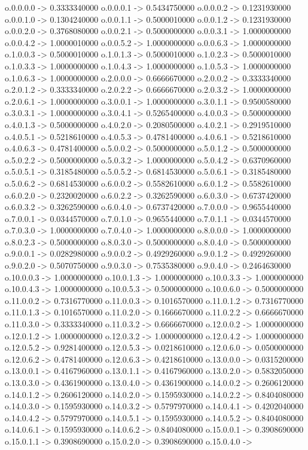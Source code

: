 o.0.0.0.0 -> 0.3333340000    o.0.0.0.1 -> 0.5434750000    o.0.0.0.2 -> 0.1231930000    o.0.0.1.0 -> 0.1304240000    o.0.0.1.1 -> 0.5000010000    o.0.0.1.2 -> 0.1231930000    o.0.0.2.0 -> 0.3768080000    o.0.0.2.1 -> 0.5000000000    o.0.0.3.1 -> 1.0000000000    o.0.0.4.2 -> 1.0000010000    o.0.0.5.2 -> 1.0000000000    o.0.0.6.3 -> 1.0000000000    o.1.0.0.3 -> 0.5000010000    o.1.0.1.3 -> 0.5000010000    o.1.0.2.3 -> 0.5000010000    o.1.0.3.3 -> 1.0000000000    o.1.0.4.3 -> 1.0000000000    o.1.0.5.3 -> 1.0000000000    o.1.0.6.3 -> 1.0000000000    o.2.0.0.0 -> 0.6666670000    o.2.0.0.2 -> 0.3333340000    o.2.0.1.2 -> 0.3333340000    o.2.0.2.2 -> 0.6666670000    o.2.0.3.2 -> 1.0000000000    o.2.0.6.1 -> 1.0000000000    o.3.0.0.1 -> 1.0000000000    o.3.0.1.1 -> 0.9500580000    o.3.0.3.1 -> 1.0000000000    o.3.0.4.1 -> 0.5265400000    o.4.0.0.3 -> 0.5000000000    o.4.0.1.3 -> 0.5000000000    o.4.0.2.0 -> 0.2080500000    o.4.0.2.1 -> 0.2919510000    o.4.0.5.1 -> 0.5218610000    o.4.0.5.3 -> 0.4781400000    o.4.0.6.1 -> 0.5218610000    o.4.0.6.3 -> 0.4781400000    o.5.0.0.2 -> 0.5000000000    o.5.0.1.2 -> 0.5000000000    o.5.0.2.2 -> 0.5000000000    o.5.0.3.2 -> 1.0000000000    o.5.0.4.2 -> 0.6370960000    o.5.0.5.1 -> 0.3185480000    o.5.0.5.2 -> 0.6814530000    o.5.0.6.1 -> 0.3185480000    o.5.0.6.2 -> 0.6814530000    o.6.0.0.2 -> 0.5582610000    o.6.0.1.2 -> 0.5582610000    o.6.0.2.0 -> 0.2320020000    o.6.0.2.2 -> 0.3262590000    o.6.0.3.0 -> 0.6737420000    o.6.0.3.2 -> 0.3262590000    o.6.0.4.0 -> 0.6737420000    o.7.0.0.0 -> 0.9655440000    o.7.0.0.1 -> 0.0344570000    o.7.0.1.0 -> 0.9655440000    o.7.0.1.1 -> 0.0344570000    o.7.0.3.0 -> 1.0000000000    o.7.0.4.0 -> 1.0000000000    o.8.0.0.0 -> 1.0000000000    o.8.0.2.3 -> 0.5000000000    o.8.0.3.0 -> 0.5000000000    o.8.0.4.0 -> 0.5000000000    o.9.0.0.1 -> 0.0282980000    o.9.0.0.2 -> 0.4929260000    o.9.0.1.2 -> 0.4929260000    o.9.0.2.0 -> 0.5070750000    o.9.0.3.0 -> 0.7535380000    o.9.0.4.0 -> 0.2464630000    o.10.0.0.3 -> 1.0000000000    o.10.0.1.3 -> 1.0000000000    o.10.0.3.3 -> 1.0000000000    o.10.0.4.3 -> 1.0000000000    o.10.0.5.3 -> 0.5000000000    o.10.0.6.0 -> 0.5000000000    o.11.0.0.2 -> 0.7316770000    o.11.0.0.3 -> 0.1016570000    o.11.0.1.2 -> 0.7316770000    o.11.0.1.3 -> 0.1016570000    o.11.0.2.0 -> 0.1666670000    o.11.0.2.2 -> 0.6666670000    o.11.0.3.0 -> 0.3333340000    o.11.0.3.2 -> 0.6666670000    o.12.0.0.2 -> 1.0000000000    o.12.0.1.2 -> 1.0000000000    o.12.0.3.2 -> 1.0000000000    o.12.0.4.2 -> 1.0000000000    o.12.0.5.2 -> 0.9281400000    o.12.0.5.3 -> 0.0218610000    o.12.0.6.0 -> 0.0500000000    o.12.0.6.2 -> 0.4781400000    o.12.0.6.3 -> 0.4218610000    o.13.0.0.0 -> 0.0315200000    o.13.0.0.1 -> 0.4167960000    o.13.0.1.1 -> 0.4167960000    o.13.0.2.0 -> 0.5832050000    o.13.0.3.0 -> 0.4361900000    o.13.0.4.0 -> 0.4361900000    o.14.0.0.2 -> 0.2606120000    o.14.0.1.2 -> 0.2606120000    o.14.0.2.0 -> 0.1595930000    o.14.0.2.2 -> 0.8404080000    o.14.0.3.0 -> 0.1595930000    o.14.0.3.2 -> 0.5797970000    o.14.0.4.1 -> 0.4202040000    o.14.0.4.2 -> 0.5797970000    o.14.0.5.1 -> 0.1595930000    o.14.0.5.2 -> 0.8404080000    o.14.0.6.1 -> 0.1595930000    o.14.0.6.2 -> 0.8404080000    o.15.0.0.1 -> 0.3908690000    o.15.0.1.1 -> 0.3908690000    o.15.0.2.0 -> 0.3908690000    o.15.0.4.0 -> 
